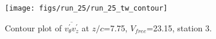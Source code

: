 \begin{figure}[H]
\centering
\texttt{[image: figs/run\_25/run\_25\_tw\_contour]}
\caption{Contour plot of $\overline{v_{\theta}^{\prime} v_{z}^{\prime}}$ at $z/c$=7.75, $V_{free}$=23.15, station 3.}
\label{fig:run_25_tw_contour}
\end{figure}


